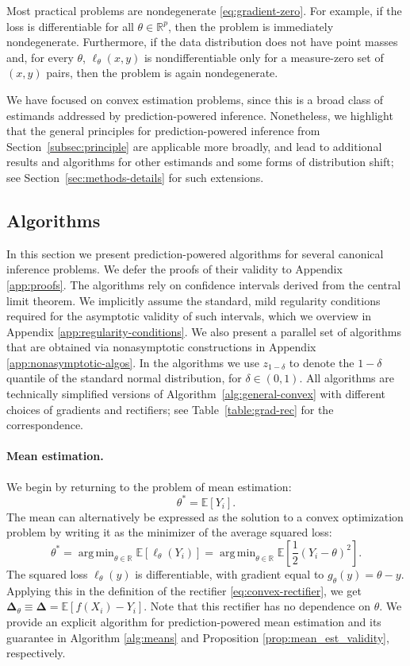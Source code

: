 \documentclass[10pt]{article}
\def\R{\mathbb{R}}
\def\E{\mathbb{E}}
\newcommand{\rec}{\mathbf{\Delta}}
\DeclareMathOperator*{\argmin}{arg\,min}
\begin{document}
Most practical problems are nondegenerate \eqref{eq:gradient-zero}. For example,
if the loss is differentiable for all $\theta\in\R^p$, then the problem is immediately nondegenerate. 
Furthermore, if the data distribution does not have point masses and, for every $\theta$, $\ell_\theta(x,y)$ is nondifferentiable only for a measure-zero set of $(x,y)$ pairs, then the problem is again nondegenerate.

We have focused on convex estimation problems, since this is a broad class of estimands addressed by prediction-powered inference. Nonetheless, we highlight that the general principles for prediction-powered inference from Section~\ref{subsec:principle} are applicable more broadly, and lead to additional results and algorithms for other estimands and some forms of distribution shift; see Section~\ref{sec:methods-details} for such extensions.

\subsection{Algorithms}
\label{subsec:explicit_algs}


In this section we present prediction-powered algorithms for several canonical inference problems.  We defer the proofs of their validity to Appendix \ref{app:proofs}. 
The algorithms rely on confidence intervals derived from the central limit theorem. We implicitly assume the standard, mild regularity conditions required for the asymptotic validity of such intervals, which we overview in Appendix \ref{app:regularity-conditions}. We also present a parallel set of algorithms that are obtained via nonasymptotic constructions in Appendix \ref{app:nonasymptotic-algos}. In the algorithms we use $z_{1-\delta}$ to denote the $1-\delta$ quantile of the standard normal distribution, for $\delta\in(0,1)$.
All algorithms are technically simplified versions of Algorithm~\ref{alg:general-convex} with different choices of gradients and rectifiers; see Table~\ref{table:grad-rec} for the correspondence.


\paragraph{Mean estimation.} We begin by returning to the problem of mean estimation:
\begin{equation}
\label{eq:mean-outcome}
\theta^* = \E[Y_i].
\end{equation}
The mean can alternatively be expressed as the solution to a convex optimization problem by writing it as the minimizer of the average squared loss:
$$\theta^* = \argmin_{\theta\in\R} \E[\ell_\theta(Y_i)] = \argmin_{\theta\in\R} \E\left[\frac{1}{2}(Y_i - \theta)^2\right].$$
The squared loss $\ell_\theta(y)$ is differentiable, with gradient equal to $g_\theta(y) = \theta - y$. Applying this in the definition of the rectifier \eqref{eq:convex-rectifier}, we get
$\rec_{\theta} \equiv \rec = \E[f(X_i) - Y_i]$.
Note that this rectifier has no dependence on $\theta$.  
We provide an explicit algorithm for prediction-powered mean estimation and its guarantee in Algorithm \ref{alg:means} and Proposition \ref{prop:mean_est_validity}, respectively.
\end{document}
